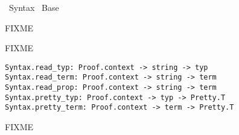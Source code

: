 %
\begin{isabellebody}%
\def\isabellecontext{Syntax}%
%
\isadelimtheory
%
\endisadelimtheory
%
\isatagtheory
{}\isamarkupfalse%
\ Syntax\isanewline
{}\ Base\isanewline
{}%
\endisatagtheory
{\isafoldtheory}%
%
\isadelimtheory
%
\endisadelimtheory
%
\isamarkuptrue%
%
\begin{isamarkuptext}%
FIXME%
\end{isamarkuptext}%
\isamarkuptrue%
%
\isamarkuptrue%
%
\begin{isamarkuptext}%
FIXME%
\end{isamarkuptext}%
\isamarkuptrue%
%
\isadelimmlref
%
\endisadelimmlref
%
\isatagmlref
%
\begin{isamarkuptext}%
\begin{mldecls}
  \verb|Syntax.read_typ: Proof.context -> string -> typ| \\
  \verb|Syntax.read_term: Proof.context -> string -> term| \\
  \verb|Syntax.read_prop: Proof.context -> string -> term| \\
  \verb|Syntax.pretty_typ: Proof.context -> typ -> Pretty.T| \\
  \verb|Syntax.pretty_term: Proof.context -> term -> Pretty.T| \\
  \end{mldecls}

  \begin{description}

  \item FIXME


\end{description}
\end{isamarkuptext}
\end{isabellebody}
